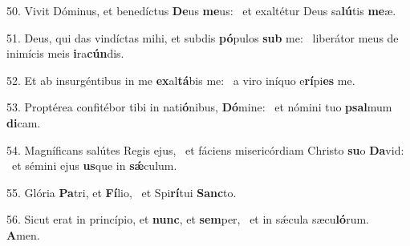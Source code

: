 50. Vivit Dóminus, et benedíctus \textbf{De}us \textbf{me}us: \ast\  et exaltétur Deus sa\textbf{lú}tis \textbf{me}æ.\

51. Deus, qui das vindíctas mihi, et subdis \textbf{pó}pulos \textbf{sub} me: \ast\  liberátor meus de inimícis meis \textbf{i}ra\textbf{cún}dis.\

52. Et ab insurgéntibus in me \textbf{ex}al\textbf{tá}bis me: \ast\  a viro iníquo e\textbf{rí}pi\textbf{es} me.\

53. Proptérea confitébor tibi in nati\textbf{ó}nibus, \textbf{Dó}mine: \ast\  et nómini tuo \textbf{psal}mum \textbf{di}cam.\

54. Magníficans salútes Regis ejus, \dag\  et fáciens misericórdiam Christo \textbf{su}o \textbf{Da}vid: \ast\  et sémini ejus \textbf{us}que in \textbf{sǽ}culum.\

55. Glória \textbf{Pa}tri, et \textbf{Fí}lio, \ast\  et Spi\textbf{rí}tui \textbf{Sanc}to.\

56. Sicut erat in princípio, et \textbf{nunc}, et \textbf{sem}per, \ast\  et in sǽcula sæcu\textbf{ló}rum. \textbf{A}men.\


